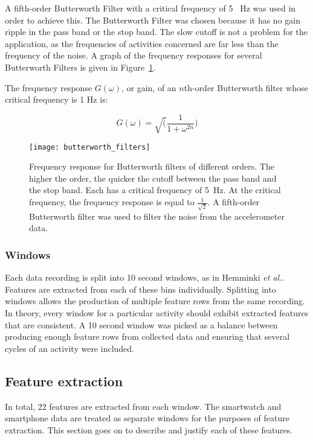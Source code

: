         A fifth-order Butterworth Filter with a critical frequency of 5~  \si{Hz} was used in order to achieve this. The Butterworth Filter was chosen because it has no gain ripple in the pass band or the stop band. The slow cutoff is not a problem for the application, as the frequencies of activities concerned are far less than the frequency of the noise. A graph of the frequency responses for several Butterworth Filters is given in Figure~\ref{fig:butterworth_filters}.
        
        The frequency response $G(\omega)$, or gain, of an $n$th-order Butterworth filter whose critical frequency is 1 \si{Hz} is:
        
        $$G(\omega) = \sqrt(\frac{1}{1+\omega^{2n}})$$
        
        \begin{figure}
          \centering
          \texttt{[image: butterworth\_filters]}
          \caption{Frequency response for Butterworth filters of different orders. The higher the order, the quicker the cutoff between the pass band and the stop band. Each has a critical frequency of 5~\si{Hz}. At the critical frequency, the frequency response is equal to $\frac{1}{\sqrt{2}}$. A fifth-order Butterworth filter was used to filter the noise from the accelerometer data. }
          \label{fig:butterworth_filters}
        \end{figure}
        
      \subsubsection{Windows}
        Each data recording is split into 10 second windows, as in Hemminki \emph{et al.}\cite{hemminki2013accelerometer}. Features are extracted from each of these bins individually. Splitting into windows allows the production of multiple feature rows from the same recording. In theory, every window for a particular activity should exhibit extracted features that are consistent. A 10 second window was picked as a balance between producing enough feature rows from collected data and ensuring that several cycles of an activity were included. 
      
    \subsection{Feature extraction}
      \label{sec:feature-extraction}
      In total, 22 features are extracted from each window. The smartwatch and smartphone data are treated as separate windows for the purposes of feature extraction. This section goes on to describe and justify each of these features.
      
